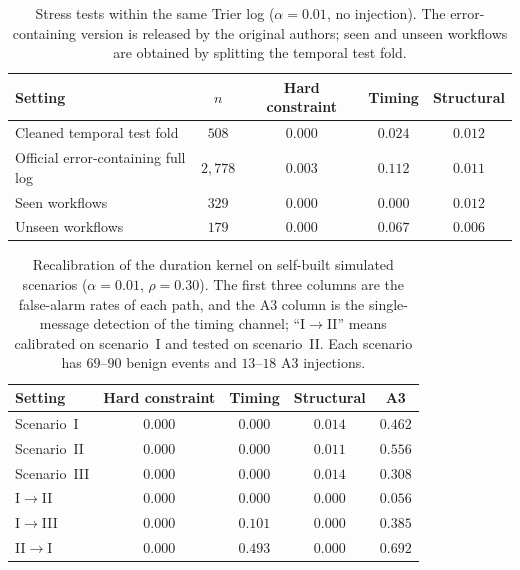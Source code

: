 \documentclass[manuscript,screen,review]{acmart}
\begin{document}
\begin{table}[!t]
\renewcommand{\arraystretch}{1.12}
\caption{Stress tests within the same {Trier} log ($\alpha=0.01$, no injection). The error-containing version is released by the original authors; seen and unseen workflows are obtained by splitting the temporal test fold.}
\label{tab:shift}
\label{tab:cprime}
\label{tab:e9}
\centering
\small
\begin{tabular}{lcccc}
\toprule
Setting & $n$ & Hard constraint & Timing & Structural \\
\midrule
Cleaned temporal test fold & $508$ & $0.000$ & $0.024$ & $0.012$ \\
Official error-containing full log & $2{,}778$ & $0.003$ & $0.112$ & $0.011$ \\
Seen workflows & $329$ & $0.000$ & $0.000$ & $0.012$ \\
Unseen workflows & $179$ & $0.000$ & $0.067$ & $0.006$ \\
\bottomrule
\end{tabular}
\end{table}

\begin{table}[!t]
\renewcommand{\arraystretch}{1.12}
\caption{Recalibration of the duration kernel on self-built simulated scenarios ($\alpha=0.01$, $\rho=0.30$). The first three columns are the false-alarm rates of each path, and the {A3} column is the single-message detection of the timing channel; ``I$\to$II'' means calibrated on scenario~I and tested on scenario~II. Each scenario has $69$--$90$ benign events and $13$--$18$ {A3} injections.}
\label{tab:e6}
\centering
\small
\begin{tabular}{lcccc}
\toprule
Setting & Hard constraint & Timing & Structural & {A3} \\
\midrule
Scenario~I & $0.000$ & $0.000$ & $0.014$ & $0.462$ \\
Scenario~II & $0.000$ & $0.000$ & $0.011$ & $0.556$ \\
Scenario~III & $0.000$ & $0.000$ & $0.014$ & $0.308$ \\
I$\to$II & $0.000$ & $0.000$ & $0.000$ & $0.056$ \\
I$\to$III & $0.000$ & $0.101$ & $0.000$ & $0.385$ \\
II$\to$I & $0.000$ & $0.493$ & $0.000$ & $0.692$ \\
\bottomrule
\end{tabular}
\end{table}

\end{document}
